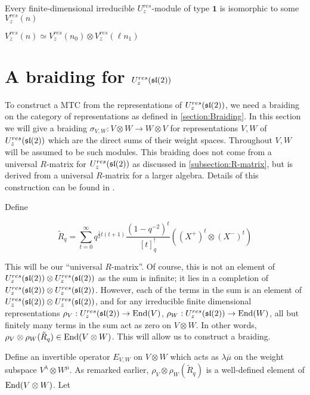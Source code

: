 \begin{theorem}
Every finite-dimensional irreducible $U_z^{res}$-module of type $\mathbf{1}$ is isomorphic to some $V_z^{res}(n)$
\end{theorem}

\begin{theorem}
$V_z^{res}(n) \simeq V_z^{res}(n_0) \otimes V_{z}^{res}(\ell n_1)$
\end{theorem}

\section{A braiding for $U_z^{res}(\mathfrak{sl}(2))$}
\label{section:braiding}

To construct a MTC from the representations of $U_z^{res}(\mathfrak{sl}(2))$, we need a
braiding on the category of representations as defined in
\ref{section:Braiding}.  In this section we will give a
braiding $\sigma_{V,W}: V \otimes W \to W \otimes V$ for representations $V,W$
of $U_z^{res}(\mathfrak{sl}(2))$ which are the direct sums of their weight spaces.
Throughout $V,W$ will be assumed to be such modules. This braiding does not
come from a universal $R$-matrix for $U_z^{res}(\mathfrak{sl}(2))$ as discussed in
\ref{subsection:R-matrix}, but is derived from a universal $R$-matrix for a
larger algebra. Details of this construction can be found in \cite{CP}.


Define 

\begin{equation}
\tilde{R}_q = \sum_{t=0}^\infty q^{\frac{1}{2} t(t+1)} \frac{(1-q^{-2})^t}{[t]_q^{!}} ((X^+)^t \otimes (X^-)^t)
\end{equation}

This will be our ``universal $R$-matrix''. Of course, this is not an element of
$U_z^{res}(\mathfrak{sl}(2)) \otimes U_z^{res}(\mathfrak{sl}(2))$ as the sum is infinite; it lies in a
completion of $U_z^{res}(\mathfrak{sl}(2)) \otimes U_z^{res}(\mathfrak{sl}(2))$. However, each of the terms
in the sum is an element of $U_z^{res}(\mathfrak{sl}(2)) \otimes U_z^{res}(\mathfrak{sl}(2))$, and for any
irreducible finite dimensional representations $\rho_V : U_z^{res}(\mathfrak{sl}(2)) \to
\operatorname{End}(V)$, $\rho_W : U_z^{res}(\mathfrak{sl}(2)) \to \operatorname{End}(W)$, all but finitely many terms in the
sum act as zero on $V \otimes W$. In other words, $\rho_V \otimes \rho_W
(\tilde{R}_q) \in \operatorname{End}(V \otimes W)$. This will allow us to construct a
braiding.


Define an invertible operator $E_{V,W}$ on $V \otimes W$ which acts as
$\lambda\overline{\mu}$ on the weight subspace $V^\lambda \otimes W^\mu$. As remarked
earlier, $\rho_V \otimes \rho_W (\tilde{R}_q) $ is a well-defined element of
$\operatorname{End}(V \otimes W)$. Let 

